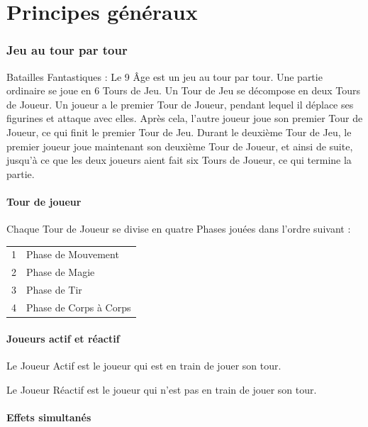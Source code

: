 
\part{Principes généraux}

\section{Jeu au tour par tour}

Batailles Fantastiques : Le 9\ieme{} Âge est un jeu au tour par tour. Une partie ordinaire se joue en 6 Tours de Jeu. Un Tour de Jeu se décompose en deux Tours de Joueur. Un joueur a le premier Tour de Joueur, pendant lequel il déplace ses figurines et attaque avec elles. Après cela, l'autre joueur joue son premier Tour de Joueur, ce qui finit le premier Tour de Jeu. Durant le deuxième Tour de Jeu, le premier joueur joue maintenant son deuxième Tour de Joueur, et ainsi de suite, jusqu'à ce que les deux joueurs aient fait six Tours de Joueur, ce qui termine la partie.

\subsection{Tour de joueur}

Chaque Tour de Joueur se divise en quatre Phases jouées dans l'ordre suivant :

\hspace*{0.3cm}
\begin{tabular}{c|l}
1 & Phase de Mouvement \tabularnewline
2 & Phase de Magie \tabularnewline
3 & Phase de Tir \tabularnewline
4 & Phase de Corps à Corps \tabularnewline
\end{tabular}

\subsection{Joueurs actif et réactif}

Le Joueur Actif est le joueur qui est en train de jouer son tour.

Le Joueur Réactif est le joueur qui n'est pas en train de jouer son tour.

\subsection{Effets simultanés}

